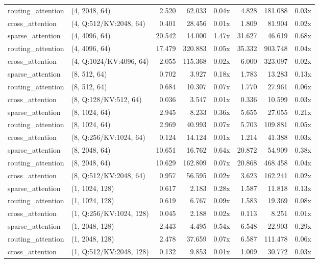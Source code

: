 \documentclass[journal]{IEEEtran}
\begin{document}
\begin{table}[t]
\begin{tabular}{llrrrrrr}
routing\_attention & (4, 2048, 64) & 2.520 & 62.033 & 0.04x & 4.828 & 181.088 & 0.03x \\
cross\_attention & (4, Q:512/KV:2048, 64) & 0.401 & 28.456 & 0.01x & 1.809 & 81.904 & 0.02x \\
sparse\_attention & (4, 4096, 64) & 20.542 & 14.000 & 1.47x & 31.627 & 46.619 & 0.68x \\
routing\_attention & (4, 4096, 64) & 17.479 & 320.883 & 0.05x & 35.332 & 903.748 & 0.04x \\
cross\_attention & (4, Q:1024/KV:4096, 64) & 2.055 & 115.368 & 0.02x & 6.000 & 323.097 & 0.02x \\
sparse\_attention & (8, 512, 64) & 0.702 & 3.927 & 0.18x & 1.783 & 13.283 & 0.13x \\
routing\_attention & (8, 512, 64) & 0.684 & 10.307 & 0.07x & 1.770 & 27.961 & 0.06x \\
cross\_attention & (8, Q:128/KV:512, 64) & 0.036 & 3.547 & 0.01x & 0.336 & 10.599 & 0.03x \\
sparse\_attention & (8, 1024, 64) & 2.945 & 8.233 & 0.36x & 5.655 & 27.055 & 0.21x \\
routing\_attention & (8, 1024, 64) & 2.969 & 40.993 & 0.07x & 5.703 & 109.881 & 0.05x \\
cross\_attention & (8, Q:256/KV:1024, 64) & 0.124 & 14.124 & 0.01x & 1.214 & 41.388 & 0.03x \\
sparse\_attention & (8, 2048, 64) & 10.651 & 16.762 & 0.64x & 20.872 & 54.909 & 0.38x \\
routing\_attention & (8, 2048, 64) & 10.629 & 162.809 & 0.07x & 20.868 & 468.458 & 0.04x \\
cross\_attention & (8, Q:512/KV:2048, 64) & 0.957 & 56.595 & 0.02x & 3.623 & 162.241 & 0.02x \\
sparse\_attention & (1, 1024, 128) & 0.617 & 2.183 & 0.28x & 1.587 & 11.818 & 0.13x \\
routing\_attention & (1, 1024, 128) & 0.619 & 6.767 & 0.09x & 1.583 & 19.369 & 0.08x \\
cross\_attention & (1, Q:256/KV:1024, 128) & 0.045 & 2.188 & 0.02x & 0.113 & 8.251 & 0.01x \\
sparse\_attention & (1, 2048, 128) & 2.443 & 4.495 & 0.54x & 6.548 & 22.903 & 0.29x \\
routing\_attention & (1, 2048, 128) & 2.478 & 37.659 & 0.07x & 6.587 & 111.478 & 0.06x \\
cross\_attention & (1, Q:512/KV:2048, 128) & 0.132 & 9.853 & 0.01x & 1.009 & 30.772 & 0.03x \\

\end{tabular}
\end{table}
\end{document}
